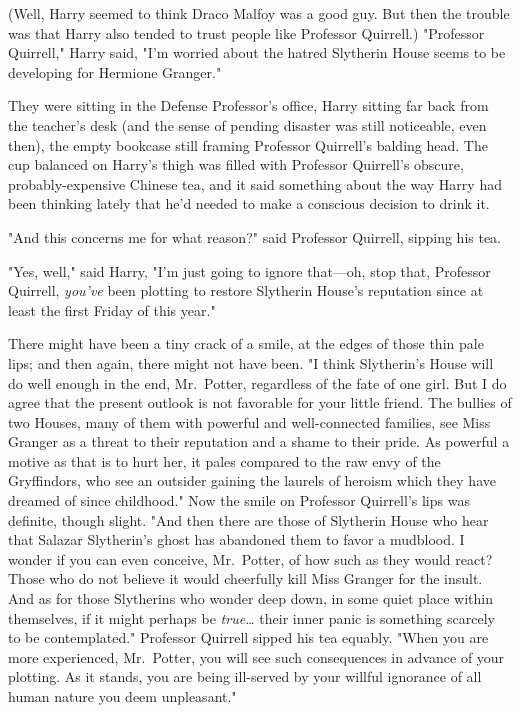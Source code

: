 (Well, Harry seemed to think Draco Malfoy was a good guy. But then the trouble 
was that Harry also tended to trust people like Professor Quirrell.)
\sbreak
"Professor Quirrell," Harry said, "I'm worried about the hatred Slytherin House 
seems to be developing for Hermione Granger."

They were sitting in the Defense Professor's office, Harry sitting far back 
from the teacher's desk (and the sense of pending disaster was still 
noticeable, even then), the empty bookcase still framing Professor Quirrell's 
balding head. The cup balanced on Harry's thigh was filled with Professor 
Quirrell's obscure, probably-expensive Chinese tea, and it said something about 
the way Harry had been thinking lately that he'd needed to make a conscious 
decision to drink it.

"And this concerns me for what reason?" said Professor Quirrell, sipping his 
tea.

"Yes, well," said Harry, "I'm just going to ignore that---oh, stop that, 
Professor Quirrell, \emph{you've} been plotting to restore Slytherin House's 
reputation since at least the first Friday of this year."

There might have been a tiny crack of a smile, at the edges of those thin pale 
lips; and then again, there might not have been. "I think Slytherin's House 
will do well enough in the end, Mr.~Potter, regardless of the fate of one girl. 
But I do agree that the present outlook is not favorable for your little 
friend. The bullies of two Houses, many of them with powerful and 
well-connected families, see Miss Granger as a threat to their reputation and a 
shame to their pride. As powerful a motive as that is to hurt her, it pales 
compared to the raw envy of the Gryffindors, who see an outsider gaining the 
laurels of heroism which they have dreamed of since childhood." Now the smile 
on Professor Quirrell's lips was definite, though slight. "And then there are 
those of Slytherin House who hear that Salazar Slytherin's ghost has abandoned 
them to favor a mudblood. I wonder if you can even conceive, Mr.~Potter, of how 
such as they would react? Those who do not believe it would cheerfully kill 
Miss Granger for the insult. And as for those Slytherins who wonder deep down, 
in some quiet place within themselves, if it might perhaps be 
\emph{true{\ldots}} their inner panic is something scarcely to be 
contemplated." Professor Quirrell sipped his tea equably. "When you are more 
experienced, Mr.~Potter, you will see such consequences in advance of your 
plotting. As it stands, you are being ill-served by your willful ignorance of 
all human nature you deem unpleasant."

